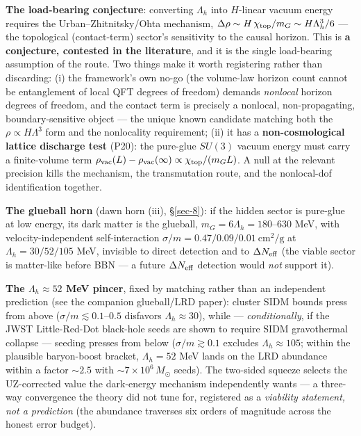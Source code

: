 \documentclass[submission, Phys]{SciPost}
\begin{document}
\textbf{The load-bearing conjecture}: converting \(\Lambda_h\) into
\(H\)-linear vacuum energy requires the Urban--Zhitnitsky/Ohta
mechanism, \(\Delta\rho \sim H\,\chi_{\rm top}/m_G \sim H\Lambda_h^3/6\)
--- the topological (contact-term) sector's sensitivity to the causal
horizon. This is \textbf{a conjecture, contested in the literature}, and
it is the single load-bearing assumption of the route. Two things make
it worth registering rather than discarding: (i) the framework's own
no-go (the volume-law horizon count cannot be entanglement of local QFT
degrees of freedom) demands \emph{nonlocal} horizon degrees of freedom,
and the contact term is precisely a nonlocal, non-propagating,
boundary-sensitive object --- the unique known candidate matching both
the \(\rho\propto H\Lambda^3\) form and the nonlocality requirement;
(ii) it has a \textbf{non-cosmological lattice discharge test} (P20):
the pure-glue \(SU(3)\) vacuum energy must carry a finite-volume term
\(\rho_{\rm vac}(L) - \rho_{\rm vac}(\infty)\propto \chi_{\rm top}/(m_G L)\).
A null at the relevant precision kills the mechanism, the transmutation
route, and the nonlocal-dof identification together.

\textbf{The glueball horn} (dawn horn (iii), §\ref{sec-8}): if the
hidden sector is pure-glue at low energy, its dark matter is the
glueball, \(m_G = 6\Lambda_h = 180\)--\(630\) MeV, with
velocity-independent self-interaction
\(\sigma/m = 0.47/0.09/0.01\ \mathrm{cm^2/g}\) at
\(\Lambda_h = 30/52/105\) MeV, invisible to direct detection and to
\(\Delta N_{\rm eff}\) (the viable sector is matter-like before BBN ---
a future \(\Delta N_{\rm eff}\) detection would \emph{not} support it).

\textbf{The \(\Lambda_h \approx 52\) MeV pincer}, fixed by matching
rather than an independent prediction (see the companion glueball/LRD
paper): cluster SIDM bounds press from above
(\(\sigma/m\lesssim 0.1\)--\(0.5\) disfavors \(\Lambda_h\approx 30\)),
while --- \emph{conditionally}, if the JWST Little-Red-Dot black-hole
seeds are shown to require SIDM gravothermal collapse --- seeding
presses from below (\(\sigma/m\gtrsim 0.1\) excludes
\(\Lambda_h\approx 105\); within the plausible baryon-boost bracket,
\(\Lambda_h = 52\) MeV lands on the LRD abundance within a factor
\(\sim 2.5\) with \(\sim 7\times 10^6\,M_\odot\) seeds). The two-sided
squeeze selects the UZ-corrected value the dark-energy mechanism
independently wants --- a three-way convergence the theory did not tune
for, registered as a \emph{viability statement, not a prediction} (the
abundance traverses six orders of magnitude across the honest error
budget).
\end{document}
